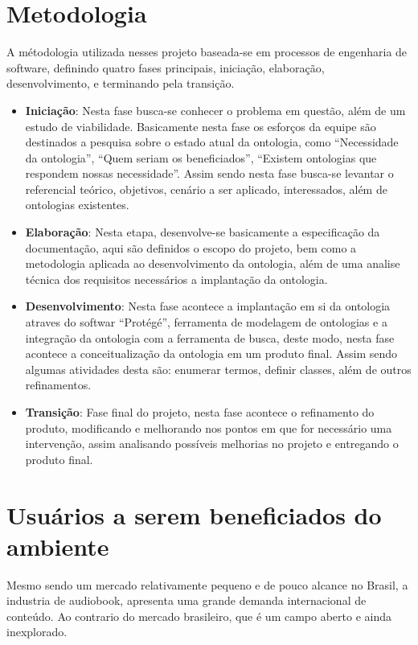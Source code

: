 \section{Metodologia}
A métodologia utilizada nesses projeto baseada-se em processos de engenharia de software, definindo quatro fases principais, iniciação, elaboração, desenvolvimento, e terminando pela transição.

\begin{itemize}
 	\item \textbf{Iniciação}: Nesta fase busca-se conhecer o problema em questão, além de um estudo de viabilidade. Basicamente nesta fase os esforços da equipe são destinados a pesquisa sobre o estado atual da ontologia, como “Necessidade da ontologia”, “Quem seriam os beneficiados”, “Existem ontologias que respondem nossas necessidade”. Assim sendo nesta fase busca-se levantar o referencial teórico, objetivos, cenário a ser aplicado, interessados, além de ontologias existentes.
 	\item \textbf{Elaboração}: Nesta etapa, desenvolve-se basicamente a especificação da documentação, aqui são definidos o escopo do projeto, bem como a metodologia aplicada ao desenvolvimento da ontologia, além de uma analise técnica dos requisitos necessários a implantação da ontologia.
	\item \textbf{Desenvolvimento}: Nesta fase acontece a implantação em si da ontologia atraves do softwar “Protégé”, ferramenta de modelagem de ontologias e a integração da ontologia com a ferramenta de busca, deste modo, nesta fase acontece a conceitualização da ontologia em um produto final. Assim sendo algumas atividades desta são: enumerar termos, definir classes, além de outros refinamentos.
	\item \textbf{Transição}: Fase final do projeto, nesta fase acontece o refinamento do produto, modificando e melhorando nos pontos em que for necessário uma intervenção, assim analisando possíveis melhorias no projeto e entregando o produto final.
\end{itemize}


\section{Usuários a serem beneficiados do ambiente }
Mesmo sendo um mercado relativamente pequeno e de pouco alcance no Brasil, a industria de audiobook, apresenta uma grande demanda internacional de conteúdo. Ao contrario do mercado brasileiro, que é um campo aberto e ainda inexplorado.

